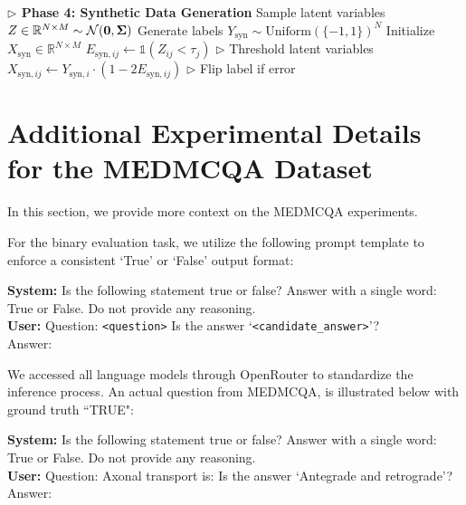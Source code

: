 \documentclass{article}
\theoremstyle{plain}
\theoremstyle{definition}
\theoremstyle{remark}
\begin{document}
\begin{algorithm}[ht]
\begin{algorithmic}[1]
\STATE
\STATE \hfill \textbf{$\triangleright$ Phase 4: Synthetic Data Generation}
\STATE Sample latent variables $Z \in \mathbb{R}^{N \times M} \sim \mathcal{N}(\mathbf{0}, {\bf \Sigma})$
\STATE Generate labels $Y_{\text{syn}} \sim \text{Uniform}(\{-1, 1\})^N$
\STATE Initialize $X_{\text{syn}} \in \mathbb{R}^{N \times M}$
        \STATE $E_{\text{syn}, ij} \leftarrow \mathds{1}(Z_{ij} < \tau_j)$ \hfill $\triangleright$ Threshold latent variables
        \STATE $X_{\text{syn}, ij} \leftarrow Y_{\text{syn}, i} \cdot (1 - 2 E_{\text{syn}, ij})$ \hfill $\triangleright$ Flip label if error
    \ENDFOR
\ENDFOR
\end{algorithmic}
\end{algorithm}

\newpage
\section{Additional Experimental Details for the MEDMCQA Dataset}\label{app:medmcqa}
In this section, we provide more context on the MEDMCQA experiments.

For the binary evaluation task, we utilize the following prompt template to enforce a consistent `True' or `False' output format:


\begin{tcolorbox}[
  colback=gray!8,
  colframe=gray!70!black,
  coltitle=white,
  title={\textbf{Query Format for MEDMCQA Dataset}},
  fonttitle=\small,
  boxrule=0.8pt,
  arc=0pt,
  left=8pt,
  right=8pt,
  top=6pt,
  bottom=6pt
]
\small
\textbf{System:} Is the following statement true or false? Answer with a single word: True or False. Do not provide any reasoning.\\[4pt]
\textbf{User:} Question: \texttt{<question>} Is the answer `\texttt{<candidate\_answer>}'?\\
Answer: 
\end{tcolorbox}

We accessed all language models through OpenRouter to standardize the inference process. An actual question from MEDMCQA, is illustrated below with ground truth ``TRUE":
\begin{tcolorbox}[
  colback=gray!8,
  colframe=gray!70!black,
  coltitle=white,
  title={\textbf{Example Query for MEDMCQA Dataset}},
  fonttitle=\small,
  boxrule=0.8pt,
  arc=0pt,
  left=8pt,
  right=8pt,
  top=6pt,
  bottom=6pt
]
\small
\textbf{System:} Is the following statement true or false? Answer with a single word: True or False. Do not provide any reasoning.\\[4pt]
\textbf{User:} Question: Axonal transport is: Is the answer `Antegrade and retrograde'?\\
Answer:
\end{tcolorbox}
\end{document}
